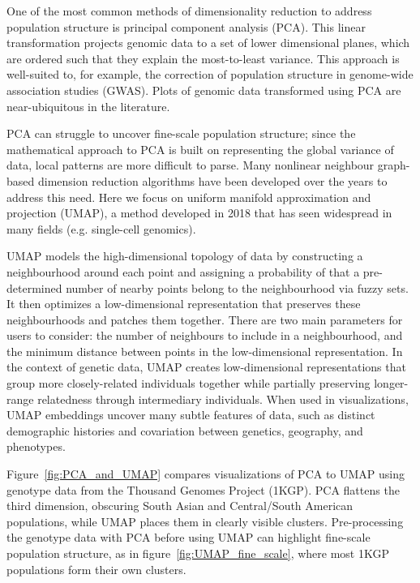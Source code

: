 \documentclass[12pt]{article}
\begin{document}
One of the most common methods of dimensionality reduction to address population structure is principal component analysis (PCA). This linear transformation projects genomic data to a set of lower dimensional planes, which are ordered such that they explain the most-to-least variance. This approach is well-suited to, for example, the correction of population structure in genome-wide association studies (GWAS).\cite{patterson2006population} Plots of genomic data transformed using PCA are near-ubiquitous in the literature.

PCA can struggle to uncover fine-scale population structure; since the mathematical approach to PCA is built on representing the global variance of data, local patterns are more difficult to parse. Many nonlinear neighbour graph-based dimension reduction algorithms have been developed over the years to address this need. Here we focus on uniform manifold approximation and projection (UMAP)\cite{mcinnes_umap_2018}, a method developed in 2018 that has seen widespread in many fields (e.g. single-cell genomics\cite{becht_dimensionality_2019}). 

UMAP models the high-dimensional topology of data by constructing a neighbourhood around each point and assigning a probability of that a pre-determined number of nearby points belong to the neighbourhood via fuzzy sets. It then optimizes a low-dimensional representation that preserves these neighbourhoods and patches them together. There are two main parameters for users to consider: the number of neighbours to include in a neighbourhood, and the minimum distance between points in the low-dimensional representation. In the context of genetic data, UMAP creates low-dimensional representations that group more closely-related individuals together while partially preserving longer-range relatedness through intermediary individuals. When used in visualizations, UMAP embeddings uncover many subtle features of data, such as distinct demographic histories and covariation between genetics, geography, and phenotypes\cite{diaz-papkovich_umap_2019}.

Figure~\ref{fig:PCA_and_UMAP} compares visualizations of PCA to UMAP using genotype data from the Thousand Genomes Project (1KGP)\cite{10002015global}. PCA flattens the third dimension, obscuring South Asian and Central/South American populations, while UMAP places them in clearly visible clusters. Pre-processing the genotype data with PCA before using UMAP can highlight fine-scale population structure, as in figure~\ref{fig:UMAP_fine_scale}, where most 1KGP populations form their own clusters.
\end{document}
